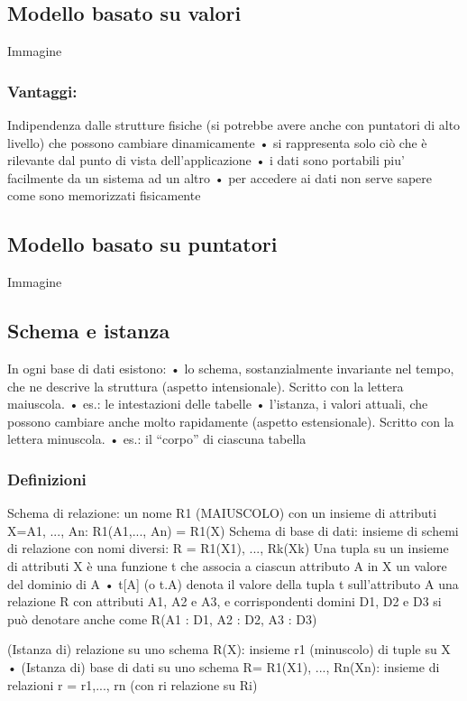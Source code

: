 \begin{itemize}
\subsection{Modello basato su valori}
Immagine
\subsubsection{Vantaggi:}
Indipendenza dalle strutture fisiche (si potrebbe avere anche 
con puntatori di alto livello) che possono cambiare
dinamicamente
• si rappresenta solo ciò che è rilevante dal punto di vista
dell'applicazione
• i dati sono portabili piu' facilmente da un sistema ad un altro
• per accedere ai dati non serve sapere come sono memorizzati
fisicamente
\subsection{Modello basato su puntatori}
Immagine

\subsection{Schema e istanza}
In ogni base di dati esistono:
• lo schema, sostanzialmente invariante nel tempo, che ne
descrive la struttura (aspetto intensionale). Scritto con la lettera maiuscola.
• es.: le intestazioni delle tabelle
• l'istanza, i valori attuali, che possono cambiare anche
molto rapidamente (aspetto estensionale). Scritto con la lettera minuscola.
• es.: il “corpo” di ciascuna tabella

\subsubsection{Definizioni}
Schema di relazione:
un nome R1 (MAIUSCOLO) con un insieme di attributi
X={A1, ..., An}:
R1(A1,..., An) = R1(X)
Schema di base di dati:
insieme di schemi di relazione con nomi diversi:
R = {R1(X1), ..., Rk(Xk)}
Una tupla su un insieme di attributi X è una funzione t che associa a
ciascun attributo A in X un valore del dominio di A
• t[A] (o t.A) denota il valore della tupla t sull'attributo A
una relazione R con attributi A1, A2 e A3, e corrispondenti
domini D1, D2 e D3 si può denotare anche come
R(A1 : D1, A2 : D2, A3 : D3)

(Istanza di) relazione su uno schema R(X):
insieme r1 (minuscolo) di tuple su X
• (Istanza di) base di dati su uno schema R= {R1(X1), ..., Rn(Xn)}:
insieme di relazioni r = {r1,..., rn} (con ri relazione su Ri)


\end{itemize}
